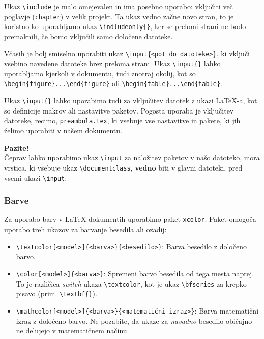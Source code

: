 Ukaz \texttt{{\textbackslash}include} je malo omejevalen in ima posebno uporabo: vključiti več poglavje (\texttt{chapter}) v velik projekt. Ta ukaz vedno začne novo stran, to je koristno ko uporabljamo ukaz \texttt{{\textbackslash}indludeonly\{\}}, ker se prelomi strani ne bodo premaknili, če bomo vključili samo določene datoteke.

Včasih je bolj smiselno uporabiti ukaz \texttt{{\textbackslash}input\{\textless pot do datoteke\textgreater \}}, ki vključi vsebino navedene datoteke brez preloma strani.
Ukaz \texttt{{\textbackslash}input\{\}} lahko uporabljamo kjerkoli v dokumentu, tudi znotraj okolij, kot so \texttt{{\textbackslash}begin\{figure\}...{\textbackslash}end\{figure\}} ali \texttt{{\textbackslash}begin\{table\}...{\textbackslash}end\{table\}}.

Ukaz \texttt{{\textbackslash}input\{\}} lahko uporabimo tudi za vključitev datotek z ukazi LaTeX-a, kot so definicije makrov ali nastavitve paketov. Pogosta uporaba je vključitev datoteke, recimo, \texttt{preambula.tex}, ki vsebuje vse nastavitve in pakete, ki jih želimo uporabiti v našem dokumentu.

\begin{framed}
\textbf{Pazite!}\\
Čeprav lahko uporabimo ukaz \texttt{{\textbackslash}input} za naložitev paketov v našo datoteko, mora vrstica, ki vsebuje ukaz \texttt{{\textbackslash}documentclass}, \textbf{vedno} biti v glavni datoteki, pred vsemi ukazi \texttt{{\textbackslash}input}.
\end{framed}

\subsubsection{Barve}

Za uporabo barv v LaTeX dokumentih uporabimo paket \texttt{xcolor}. Paket omogoča uporabo treh ukazov za barvanje besedila ali ozadij:

\begin{itemize}
\item \texttt{{\textbackslash}textcolor[\textless model\textgreater ]\{\textless barva\textgreater \}\{\textless besedilo\textgreater \}}: Barva besedilo z določeno barvo.
\item \texttt{{\textbackslash}color[\textless model\textgreater ]\{\textless barva\textgreater \}}: Spremeni barvo besedila od tega mesta naprej. To je različica \textit{switch} ukaza \texttt{{\textbackslash}textcolor}, kot je ukaz \texttt{{\textbackslash}bfseries} za krepko pisavo (prim. \texttt{{\textbackslash}textbf\{\}}).
\item \texttt{{\textbackslash}mathcolor[\textless model\textgreater ]\{\textless barva\textgreater \}\{\textless matematični\_izraz\textgreater \}}: Barva matematični izraz z določeno barvo. Ne pozabite, da ukaze za \textit{navadno} besedilo običajno ne delujejo v matematičnem načinu.
\end{itemize}

